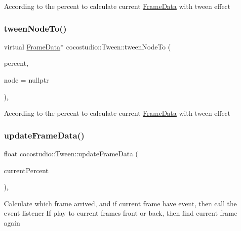 According to the percent to calculate current \hyperlink{classcocostudio_1_1FrameData}{Frame\+Data} with tween effect \mbox{\label{classcocostudio_1_1Tween_aeb476654832ee48ef69cbb6643e6dd1a}} 
\subsubsection{\texorpdfstring{tween\+Node\+To()}{tweenNodeTo()}\hspace{0.1cm}{\footnotesize\ttfamily [2/2]}}
{\footnotesize\ttfamily virtual \hyperlink{classcocostudio_1_1FrameData}{Frame\+Data}$\ast$ cocostudio\+::\+Tween\+::tween\+Node\+To (\begin{DoxyParamCaption}\item[{float}]{percent,  }\item[{\hyperlink{classcocostudio_1_1FrameData}{Frame\+Data} $\ast$}]{node = {\ttfamily nullptr} }\end{DoxyParamCaption})\hspace{0.3cm}{\ttfamily [protected]}, {\ttfamily [virtual]}}

According to the percent to calculate current \hyperlink{classcocostudio_1_1FrameData}{Frame\+Data} with tween effect \mbox{\label{classcocostudio_1_1Tween_ad9af80853f52ed2470848352a7be5793}} 
\subsubsection{\texorpdfstring{update\+Frame\+Data()}{updateFrameData()}\hspace{0.1cm}{\footnotesize\ttfamily [1/2]}}
{\footnotesize\ttfamily float cocostudio\+::\+Tween\+::update\+Frame\+Data (\begin{DoxyParamCaption}\item[{float}]{current\+Percent }\end{DoxyParamCaption})\hspace{0.3cm}{\ttfamily [protected]}, {\ttfamily [virtual]}}

Calculate which frame arrived, and if current frame have event, then call the event listener If play to current frame\textquotesingle{}s front or back, then find current frame again

